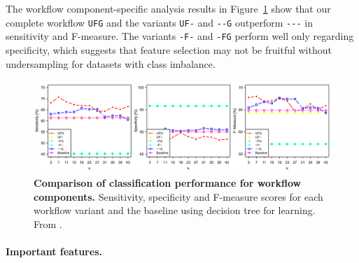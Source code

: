 \documentclass[
  oneside]{book}
\begin{document}
The workflow component-specific analysis results in Figure~\ref{fig:07-perf-wf-components} show that our complete workflow \texttt{UFG} and the variants \texttt{UF-} and \texttt{-\/-G} outperform \texttt{-\/-\/-} in sensitivity and F-measure.
The variants \texttt{-F-} and \texttt{-FG} perform well only regarding specificity, which suggests that feature selection may not be fruitful without undersampling for datasets with class imbalance.



\begin{figure}[h]

{\centering \includegraphics[width=1\linewidth]{figures/07-perf-wf-components} 

}

\caption{\textbf{Comparison of classification performance for workflow components.} Sensitivity, specificity and F-measure scores for each workflow variant and the baseline using decision tree for learning. From \autocite{Niemann:CBMS2015}.}\label{fig:07-perf-wf-components}
\end{figure}

\paragraph*{Important features.}
\end{document}
